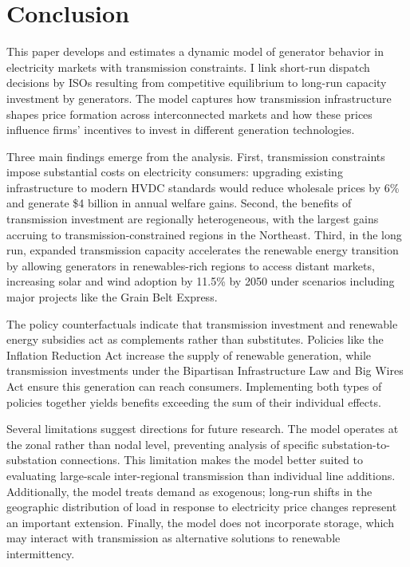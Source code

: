 \documentclass[12pt]{article}
\begin{document}
\section{Conclusion} \label{sec:conclusion}

This paper develops and estimates a dynamic model of generator behavior in electricity markets with transmission constraints. I link short-run dispatch decisions by ISOs resulting from competitive equilibrium to long-run capacity investment by generators. The model captures how transmission infrastructure shapes price formation across interconnected markets and how these prices influence firms' incentives to invest in different generation technologies.

Three main findings emerge from the analysis. First, transmission constraints impose substantial costs on electricity consumers: upgrading existing infrastructure to modern HVDC standards would reduce wholesale prices by 6\% and generate \$4 billion in annual welfare gains. Second, the benefits of transmission investment are regionally heterogeneous, with the largest gains accruing to transmission-constrained regions in the Northeast. Third, in the long run, expanded transmission capacity accelerates the renewable energy transition by allowing generators in renewables-rich regions to access distant markets, increasing solar and wind adoption by 11.5\% by 2050 under scenarios including major projects like the Grain Belt Express.

The policy counterfactuals indicate that transmission investment and renewable energy subsidies act as complements rather than substitutes. Policies like the Inflation Reduction Act increase the supply of renewable generation, while transmission investments under the Bipartisan Infrastructure Law and Big Wires Act ensure this generation can reach consumers. Implementing both types of policies together yields benefits exceeding the sum of their individual effects.

Several limitations suggest directions for future research. The model operates at the zonal rather than nodal level, preventing analysis of specific substation-to-substation connections. This limitation makes the model better suited to evaluating large-scale inter-regional transmission than individual line additions. Additionally, the model treats demand as exogenous; long-run shifts in the geographic distribution of load in response to electricity price changes represent an important extension. Finally, the model does not incorporate storage, which may interact with transmission as alternative solutions to renewable intermittency.
\end{document}
